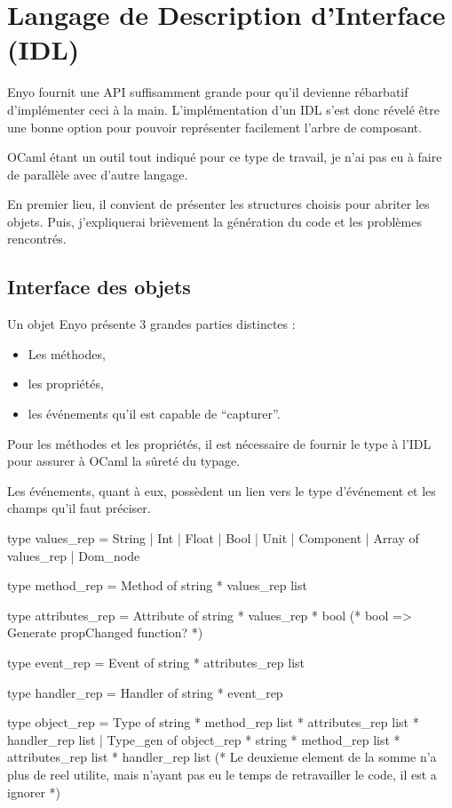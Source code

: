 \documentclass[11pt,a4paper]{report}
\begin{document}
\chapter{Langage de Description d'Interface (IDL)}\label{chap:idl}

Enyo fournit une API suffisamment grande pour qu'il devienne rébarbatif d'implémenter
ceci à la main. L'implémentation d'un IDL s'est donc révelé être une bonne option pour pouvoir
représenter facilement l'arbre de composant.

OCaml étant un outil tout indiqué pour ce type de travail, je n'ai pas eu à faire de parallèle 
avec d'autre langage.

En premier lieu, il convient de présenter les structures choisis pour abriter les objets.
Puis, j'expliquerai brièvement la génération du code et les problèmes rencontrés.

\section{Interface des objets}

Un objet Enyo présente 3 grandes parties distinctes :
\begin{itemize}
  \item Les méthodes,
  \item les propriétés,
  \item les événements qu'il est capable de ``capturer''.
\end{itemize}

Pour les méthodes et les propriétés, il est nécessaire de fournir le type à l'IDL pour assurer à
OCaml la sûreté du typage.

Les événements, quant à eux, possèdent un lien vers le type d'événement et les champs qu'il faut préciser.

\begin{OCaml}
type values_rep =  String | Int | Float | Bool | Unit 
		   | Component | Array of values_rep | Dom_node

type method_rep = Method of string * values_rep list

type attributes_rep = Attribute of string * values_rep * bool (* bool => Generate propChanged function? *)

type event_rep = Event of string * attributes_rep list

type handler_rep = Handler of string * event_rep

type object_rep = Type of string * method_rep list * attributes_rep list * handler_rep list
		  | Type_gen of object_rep * string * method_rep list * attributes_rep list * handler_rep list
                  (* Le deuxieme element de la somme n'a plus de reel utilite, mais n'ayant pas eu le temps
                  de retravailler le code, il est a ignorer *)
\end{OCaml}
\end{document}
